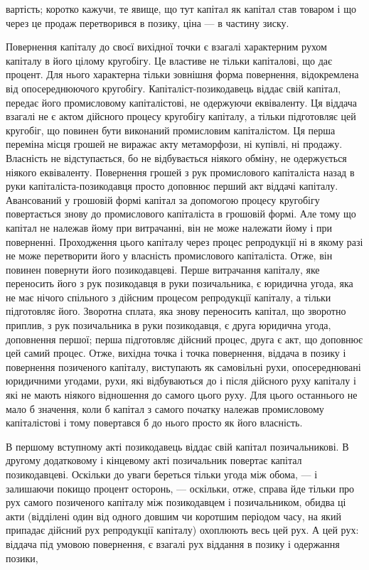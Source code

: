 вартість; коротко кажучи, те явище, що тут капітал як капітал
став товаром і що через це продаж перетворився в позику,
ціна — в частину зиску.

Повернення капіталу до своєї вихідної точки є взагалі характерним
рухом капіталу в його цілому кругобігу. Це властиве
не тільки капіталові, що дає процент. Для нього характерна
тільки зовнішня форма повернення, відокремлена від опосереднюючого
кругобігу. Капіталіст-позикодавець віддає свій
капітал, передає його промисловому капіталістові, не одержуючи
еквіваленту. Ця віддача взагалі не є актом дійсного процесу
кругобігу капіталу, а тільки підготовляє цей кругобіг, що повинен
бути виконаний промисловим капіталістом. Ця перша переміна
місця грошей не виражає акту метаморфози, ні купівлі, ні
продажу. Власність не відступається, бо не відбувається ніякого
обміну, не одержується ніякого еквіваленту. Повернення грошей
з рук промислового капіталіста назад в руки капіталіста-позикодавця
просто доповнює перший акт віддачі капіталу. Авансований
у грошовій формі капітал за допомогою процесу кругобігу
повертається знову до промислового капіталіста в грошовій
формі. Але тому що капітал не належав йому при витрачанні,
він не може належати йому і при поверненні. Проходження
цього капіталу через процес репродукції ні в якому разі не
може перетворити його у власність промислового капіталіста.
Отже, він повинен повернути його позикодавцеві. Перше витрачання
капіталу, яке переносить його з рук позикодавця в руки позичальника,
є юридична угода, яка не має нічого спільного з дійсним
процесом репродукції капіталу, а тільки підготовляє його.
Зворотна сплата, яка знову переносить капітал, що зворотно
приплив, з рук позичальника в руки позикодавця, є друга юридична
угода, доповнення першої; перша підготовляє дійсний
процес, друга є акт, що доповнює цей самий процес. Отже,
вихідна точка і точка повернення, віддача в позику і повернення
позиченого капіталу, виступають як самовільні рухи, опосереднювані
юридичними угодами, рухи, які відбуваються до і після
дійсного руху капіталу і які не мають ніякого відношення до самого
цього руху. Для цього останнього не мало б значення,
коли б капітал з самого початку належав промисловому капіталістові
і тому повертався б до нього просто як його власність.

В першому вступному акті позикодавець віддає свій капітал
позичальникові. В другому додатковому і кінцевому акті позичальник
повертає капітал позикодавцеві. Оскільки до уваги береться
тільки угода між обома, — і залишаючи покищо процент
осторонь, — оскільки, отже, справа йде тільки про рух самого
позиченого капіталу між позикодавцем і позичальником, обидва
ці акти (відділені один від одного довшим чи коротшим періодом
часу, на який припадає дійсний рух репродукції капіталу)
охоплюють весь цей рух. А цей рух: віддача під умовою повернення,
є взагалі рух віддання в позику і одержання позики,
